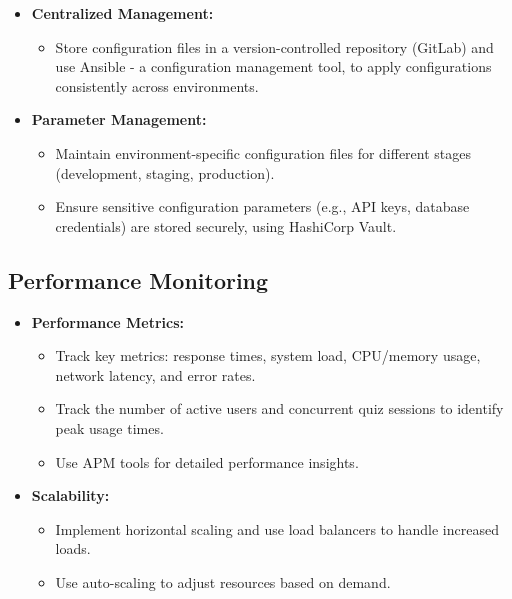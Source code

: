 \begin{itemize}
    \item \textbf{Centralized Management:}
          \begin{itemize}
              \item Store configuration files in a version-controlled repository (GitLab) and use Ansible - a configuration management tool, to apply configurations consistently across environments.
          \end{itemize}
    \item \textbf{Parameter Management:}
          \begin{itemize}
              \item Maintain environment-specific configuration files for different stages (development, staging, production).
              \item Ensure sensitive configuration parameters (e.g., API keys, database credentials) are stored securely, using HashiCorp Vault.
          \end{itemize}
\end{itemize}


\subsection{Performance Monitoring}

\begin{itemize}
    \item \textbf{Performance Metrics:}
          \begin{itemize}
              \item Track key metrics: response times, system load, CPU/memory usage, network latency, and error rates.
              \item Track the number of active users and concurrent quiz sessions to identify peak usage times.
              \item Use APM tools for detailed performance insights.
          \end{itemize}
    \item \textbf{Scalability:}
          \begin{itemize}
              \item Implement horizontal scaling and use load balancers to handle increased loads.
              \item Use auto-scaling to adjust resources based on demand.
          \end{itemize}
\end{itemize}


